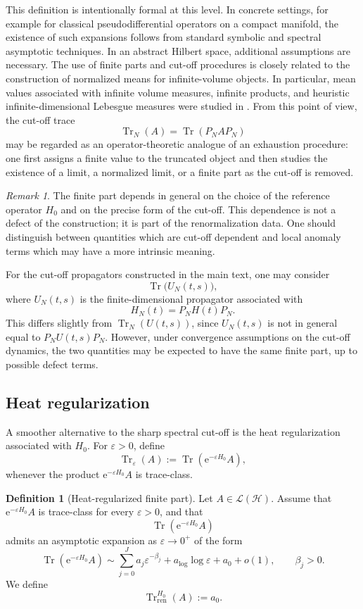 \documentclass[11pt]{amsart}
\theoremstyle{plain}
\theoremstyle{definition}
\newtheorem{definition}[theorem]{Definition}
\theoremstyle{remark}
\newtheorem{remark}[theorem]{Remark}
\newcommand{\Hilb}{\mathcal H}
\newcommand{\Tr}{\operatorname{Tr}}
\newcommand{\ee}{\mathrm e}
\begin{document}
This definition is intentionally formal at this level.  In concrete
settings, for example for classical pseudodifferential operators on a
compact manifold, the existence of such expansions follows from
standard symbolic and spectral asymptotic techniques.  In an abstract
Hilbert space, additional assumptions are necessary.
The use of finite parts and cut-off procedures is closely related to
the construction of normalized means for infinite-volume objects.  In
particular, mean values associated with infinite volume measures,
infinite products, and heuristic infinite-dimensional Lebesgue measures
were studied in \cite{Magnot2017MeanValue}.  From this point of view,
the cut-off trace
\[
        \Tr_N(A)=\Tr(P_NAP_N)
\]
may be regarded as an operator-theoretic analogue of an exhaustion
procedure: one first assigns a finite value to the truncated object and
then studies the existence of a limit, a normalized limit, or a finite
part as the cut-off is removed.
\begin{remark}
The finite part depends in general on the choice of the reference
operator \(H_0\) and on the precise form of the cut-off.  This
dependence is not a defect of the construction; it is part of the
renormalization data.  One should distinguish between quantities which
are cut-off dependent and local anomaly terms which may have a more
intrinsic meaning.
\end{remark}

For the cut-off propagators constructed in the main text, one may
consider
\[
        \Tr\big(U_N(t,s)\big),
\]
where \(U_N(t,s)\) is the finite-dimensional propagator associated with
\[
        H_N(t)=P_NH(t)P_N.
\]
This differs slightly from \(\Tr_N(U(t,s))\), since \(U_N(t,s)\) is not
in general equal to \(P_NU(t,s)P_N\).  However, under convergence
assumptions on the cut-off dynamics, the two quantities may be expected
to have the same finite part, up to possible defect terms.

\subsection{Heat regularization}

A smoother alternative to the sharp spectral cut-off is the heat
regularization associated with \(H_0\).  For \(\varepsilon>0\), define
\[
        \Tr_\varepsilon(A)
        :=
        \Tr(\ee^{-\varepsilon H_0}A),
\]
whenever the product \(\ee^{-\varepsilon H_0}A\) is trace-class.

\begin{definition}[Heat-regularized finite part]
Let \(A\in\mathcal L(\Hilb)\).  Assume that
\(\ee^{-\varepsilon H_0}A\) is trace-class for every
\(\varepsilon>0\), and that
\[
        \Tr(\ee^{-\varepsilon H_0}A)
\]
admits an asymptotic expansion as \(\varepsilon\to0^+\) of the form
\[
        \Tr(\ee^{-\varepsilon H_0}A)
        \sim
        \sum_{j=0}^{J} a_j\varepsilon^{-\beta_j}
        +
        a_{\log}\log\varepsilon
        +
        a_0
        +
        o(1),
        \qquad \beta_j>0.
\]
We define
\[
        \Tr_{\mathrm{ren}}^{H_0}(A)
        :=
        a_0.
\]
\end{definition}
\end{document}
